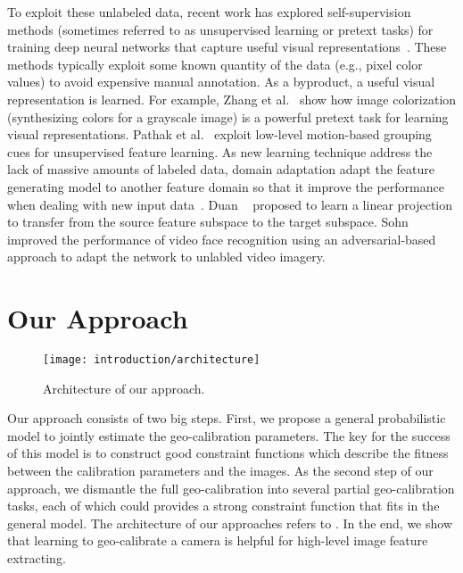 To exploit these unlabeled data, recent work has explored
self-supervision methods (sometimes referred to as unsupervised learning or
pretext tasks) for training deep neural networks that capture useful
visual representations~\cite{doersch2015unsupervised,pathak2016context}. 
These methods typically
exploit some known quantity of the data (e.g., pixel color values) to
avoid expensive manual annotation. As a byproduct, a useful visual
representation is learned.
For example, Zhang et al.~\cite{zhang2016colorful} show how image
colorization (synthesizing colors for a grayscale image) is a powerful
pretext task for learning visual representations. Pathak et
al.~\cite{pathak2017learning} exploit low-level motion-based grouping
cues for unsupervised feature learning.  
%
As new learning technique address the lack of massive amounts of
labeled data, domain adaptation adapt the feature generating model to
another feature domain so that it improve the performance when dealing
with new input
data~\cite{fernando2013unsupervised,fernando2015joint,saenko2010adapting,wang2016actions,tinghui2016flow}.
Duan \etal~\cite{duan2012learning} proposed to learn a linear
projection to transfer from the source feature subspace to the target
subspace. Sohn \etal~\cite{sohn2017unsupervised} improved the
performance of video face recognition using an adversarial-based
approach to adapt the network to unlabled video imagery.

\section{Our Approach}

\begin{figure}
  \centering
  \texttt{[image: introduction/architecture]}
  \caption{Architecture of our approach.}
  \label{fig:intro:architecture}
\end{figure}

Our approach consists of two big steps. First, we propose a general
probabilistic model to jointly estimate the geo-calibration
parameters. The key for the success of this model is to construct good
constraint functions which describe the fitness between the calibration
parameters and the images. As the second step of our approach, we
dismantle the full geo-calibration into several partial
geo-calibration tasks, each of which could provides a strong constraint
function that fits in the general model. The architecture of
our approaches refers to .
%
In the end, we show that learning to geo-calibrate a camera is helpful
for high-level image feature extracting.


